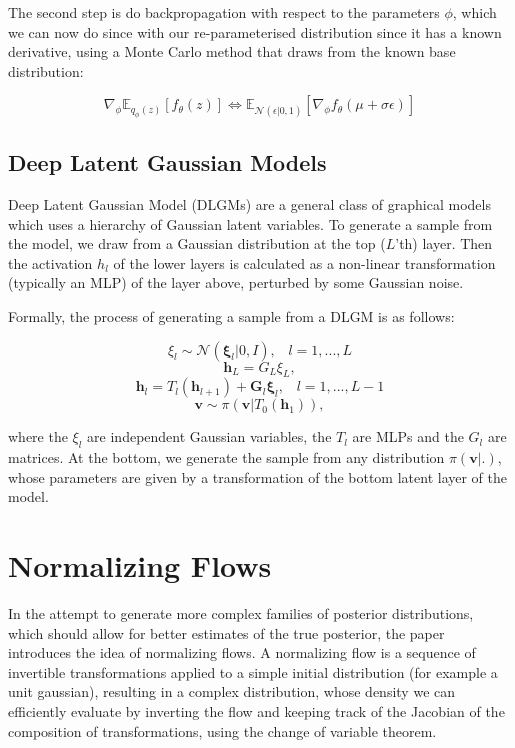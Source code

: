 The second step is do backpropagation with respect to the parameters $\phi$, which we can now do since with our re-parameterised distribution since it has a known derivative, using a Monte Carlo method that draws from the known base distribution:

\begin{equation}
	\nabla_\phi\mathbb{E}_{q_\phi(z)}[f_\theta(z)] \Leftrightarrow \mathbb{E}_{\mathcal{N}(\epsilon |0,1)}[\nabla_\phi f_\theta(\mu + \sigma\epsilon)]
\end{equation}

\subsection{Deep Latent Gaussian Models}
Deep Latent Gaussian Model (DLGMs) are a general class of graphical models which uses a hierarchy of Gaussian latent variables. To generate a sample from the model, we draw from a Gaussian distribution at the top ($L$'th) layer. Then the activation $h_l$ of the lower layers is calculated as a non-linear transformation (typically an MLP) of the layer above, perturbed by some Gaussian noise.

Formally, the process of generating a sample from a DLGM is as follows:

\[ \xi_l \sim \mathcal{N}(\mathbf{\xi}_l |0, I), \;\;\; l=1,...,L \tag{1} \]
\[ \mathbf{h}_L = G_L\xi_L, \tag{2} \]
\[ \mathbf{h}_l = T_l(\mathbf{h}_{l+1}) + \mathbf{G}_l\mathbf{\xi}_l, \;\;\; l=1,...,L-1 \tag{3} \]
\[ \mathbf{v} \sim \pi(\mathbf{v}|T_0(\mathbf{h}_1)), \tag{4} \]

where the $\xi_l$ are independent Gaussian variables, the $T_l$ are MLPs and the $G_l$ are matrices. At the bottom, we generate the sample from any distribution $\pi(\mathbf{v}|.)$, whose parameters are given by a transformation of the bottom latent layer of the model.

\section{Normalizing Flows}
In the attempt to generate more complex families of posterior distributions, which should allow for better estimates of the true posterior, the paper introduces the idea of normalizing flows. A normalizing flow is a sequence of invertible transformations applied to a simple initial distribution (for example a unit gaussian), resulting in a complex distribution, whose density we can efficiently evaluate by inverting the flow and keeping track of the Jacobian of the composition of transformations, using the change of variable theorem.

